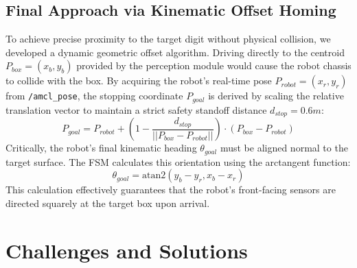 \documentclass[11pt, a4paper]{article}
\begin{document}
\subsection{Final Approach via Kinematic Offset Homing}
To achieve precise proximity to the target digit without physical collision, we developed a dynamic geometric offset algorithm. Driving directly to the centroid $P_{box}=(x_{b}, y_{b})$ provided by the perception module would cause the robot chassis to collide with the box. By acquiring the robot's real-time pose $P_{robot}=(x_{r}, y_{r})$ from \texttt{/amcl\_pose}, the stopping coordinate $P_{goal}$ is derived by scaling the relative translation vector to maintain a strict safety standoff distance $d_{stop} = 0.6m$:
\begin{equation}
    P_{goal} = P_{robot} + \left( 1 - \frac{d_{stop}}{|| P_{box} - P_{robot} ||} \right) \cdot (P_{box} - P_{robot})
\end{equation}
Critically, the robot's final kinematic heading $\theta_{goal}$ must be aligned normal to the target surface. The FSM calculates this orientation using the arctangent function:
\begin{equation}
    \theta_{goal} = \text{atan2}(y_{b} - y_{r}, x_{b} - x_{r})
\end{equation}
This calculation effectively guarantees that the robot's front-facing sensors are directed squarely at the target box upon arrival.

\section{Challenges and Solutions}
\end{document}
